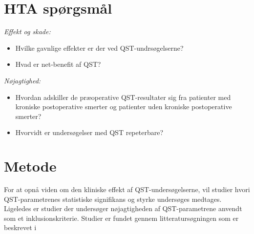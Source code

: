 \section{HTA spørgsmål}
\textit{Effekt og skade:}
\begin{itemize}
	\item Hvilke gavnlige effekter er der ved QST-undrsøgelserne? %
	\item Hvad er net-benefit af QST? %
\end{itemize}
\textit{Nøjagtighed:}
\begin{itemize}
	\item Hvordan adskiller de præoperative QST-resultater sig fra patienter med kroniske postoperative smerter og patienter uden kroniske postoperative smerter? %
	\item Hvorvidt er undersøgelser med QST repeterbare? 
\end{itemize}

\section{Metode}
For at opnå viden om den kliniske effekt af QST-undersøgelserne, vil studier hvori QST-parametrenes statistiske signifikans og styrke undersøges medtages. Ligeledes er studier der undersøger nøjagtigheden af QST-parametrene anvendt som et inklusionskriterie. Studier er fundet gennem litteratursøgningen som er beskrevet i \secref{}


